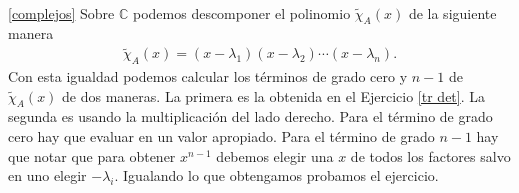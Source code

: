\documentclass[12pt]{amsart}
\begin{document}
\

\eqref{complejos} Sobre $\mathbb{C}$ podemos descomponer el polinomio $\tilde\chi_A(x)$ de la siguiente manera
\begin{align*}
\tilde\chi_A(x)=(x-\lambda_1)(x-\lambda_2)\cdots(x-\lambda_n).
\end{align*} 
Con esta igualdad podemos calcular los t\'erminos de grado cero y $n-1$ de $\tilde\chi_A(x)$ de dos maneras. La primera es la obtenida en el Ejercicio \eqref{tr det}. La segunda es usando la multiplicaci\'on del lado derecho. Para el t\'ermino de grado cero hay que evaluar en un valor apropiado. Para el t\'ermino de grado $n-1$ hay que notar que para obtener $x^{n-1}$ debemos elegir una $x$ de todos los factores salvo en uno elegir $-\lambda_i$. Igualando lo que obtengamos probamos el ejercicio.
\end{document}
